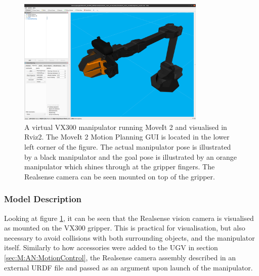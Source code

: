 \begin{figure}[htp!]
  \centering
  \includegraphics[width = 0.8\textwidth]{Figures/figVX300Moveit.png}
  \caption{A virtual VX300 manipulator running MoveIt 2 and visualised in Rviz2. The MoveIt 2 Motion Planning GUI is located in the lower left corner of the figure. The actual manipulator pose is illustrated by a black manipulator and the goal pose is illustrated by an orange manipulator which shines through at the gripper fingers. The Realsense camera can be seen mounted on top of the gripper.}
  \label{fig:VX300Moveit}
\end{figure}

\subsubsection{Model Description}
Looking at figure \ref{fig:VX300Moveit}, it can be seen that the Realsense vision camera is visualised as mounted on the VX300 gripper. This is practical for visualisation, but also necessary to avoid collisions with both surrounding objects, and the manipulator itself. Similarly to how accessories were added to the UGV in section \ref{sec:M:AN:MotionControl}, the Realsense camera assembly described in an external URDF file and passed as an argument upon launch of the manipulator.

